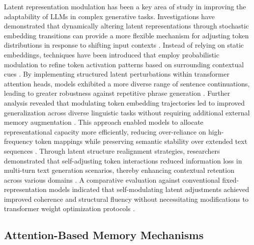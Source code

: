 Latent representation modulation has been a key area of study in improving the adaptability of LLMs in complex generative tasks. Investigations have demonstrated that dynamically altering latent representations through stochastic embedding transitions can provide a more flexible mechanism for adjusting token distributions in response to shifting input contexts \cite{kuse2024dynamic}. Instead of relying on static embeddings, techniques have been introduced that employ probabilistic modulation to refine token activation patterns based on surrounding contextual cues \cite{higginbotham2024prompting}. By implementing structured latent perturbations within transformer attention heads, models exhibited a more diverse range of sentence continuations, leading to greater robustness against repetitive phrase generation \cite{vitiello2024context}. Further analysis revealed that modulating token embedding trajectories led to improved generalization across diverse linguistic tasks without requiring additional external memory augmentation \cite{korbanov2024hierarchical}. This approach enabled models to allocate representational capacity more efficiently, reducing over-reliance on high-frequency token mappings while preserving semantic stability over extended text sequences \cite{harrow2024contextual}. Through latent structure realignment strategies, researchers demonstrated that self-adjusting token interactions reduced information loss in multi-turn text generation scenarios, thereby enhancing contextual retention across various domains \cite{ikaris2024context}. A comparative evaluation against conventional fixed-representation models indicated that self-modulating latent adjustments achieved improved coherence and structural fluency without necessitating modifications to transformer weight optimization protocols \cite{wench2024factored}.

\subsection{Attention-Based Memory Mechanisms}

